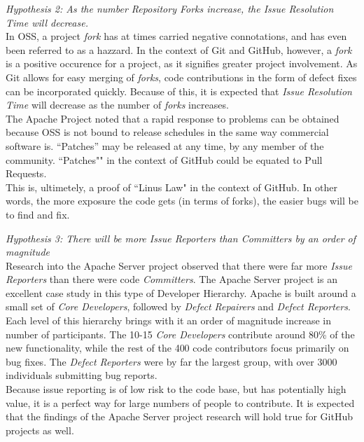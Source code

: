 \documentclass{proc}
\begin{document}
\emph{Hypothesis 2: As the number Repository Forks increase, the Issue Resolution Time will decrease.}\\
In OSS, a project \emph{fork} has at times carried negative connotations, and has even been referred to as a hazzard\cite{kogut2001open}. In the context of Git and GitHub, however, a \emph{fork} is a positive occurence for a project, as it signifies greater project involvement. As Git allows for easy merging of \emph{forks}, code contributions in the form of defect fixes can be incorporated quickly. Because of this, it is expected that \emph{Issue Resolution Time} will decrease as the number of \emph{forks} increases.\\

The Apache Project noted that a rapid response to problems can be obtained because OSS is not bound to release schedules in the same way commercial software is. ``Patches'' may be released at any time, by any member of the community\cite{mockus2000case}. ``Patches"" in the context of GitHub could be equated to Pull Requests.\\

This is, ultimetely, a proof of ``Linus Law"\cite{raymond1999cathedral} in the context of GitHub. In other words, the more exposure the code gets (in terms of forks), the easier bugs will be to find and fix.

\emph{Hypothesis 3: There will be more Issue Reporters than Committers by an order of magnitude}\\
Research into the Apache Server project observed that there were far more \emph{Issue Reporters} than there were code \emph{Committers}\cite{mockus2000case}. The Apache Server project is an excellent case study in this type of Developer Hierarchy. Apache is built around a small set of {\it Core Developers}, followed by {\it Defect Repairers} and {\it Defect Reporters}. Each level of this hierarchy brings with it an order of magnitude increase in number of participants. The 10-15 {\it Core Developers} contribute around 80\% of the new functionality, while the rest of the 400 code contributors focus primarily on bug fixes. The {\it Defect Reporters} were by far the largest group, with over 3000 individuals submitting bug reports.\\

Because issue reporting is of low risk to the code base, but has potentially high value, it is a perfect way for large numbers of people to contribute. It is expected that the findings of the Apache Server project research will hold true for GitHub projects as well.\\
\end{document}
